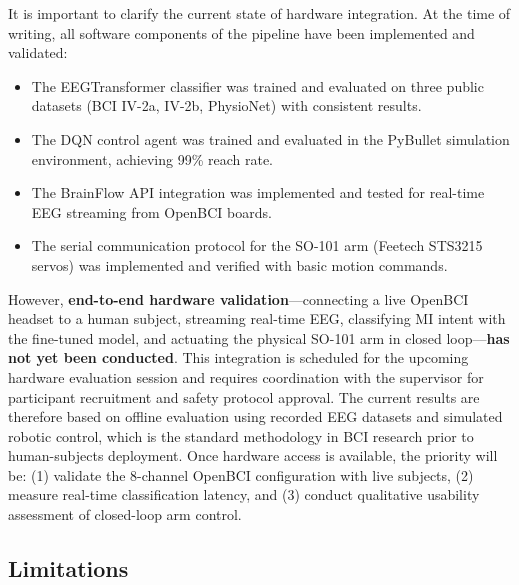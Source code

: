 \documentclass[12pt, a4paper]{article}
\begin{document}
It is important to clarify the current state of hardware integration. At the time of writing, all software components of the pipeline have been implemented and validated:
\begin{itemize}
    \item The EEGTransformer classifier was trained and evaluated on three public datasets (BCI IV-2a, IV-2b, PhysioNet) with consistent results.
    \item The DQN control agent was trained and evaluated in the PyBullet simulation environment, achieving 99\% reach rate.
    \item The BrainFlow API integration was implemented and tested for real-time EEG streaming from OpenBCI boards.
    \item The serial communication protocol for the SO-101 arm (Feetech STS3215 servos) was implemented and verified with basic motion commands.
\end{itemize}

However, \textbf{end-to-end hardware validation}---connecting a live OpenBCI headset to a human subject, streaming real-time EEG, classifying MI intent with the fine-tuned model, and actuating the physical SO-101 arm in closed loop---\textbf{has not yet been conducted}. This integration is scheduled for the upcoming hardware evaluation session and requires coordination with the supervisor for participant recruitment and safety protocol approval. The current results are therefore based on offline evaluation using recorded EEG datasets and simulated robotic control, which is the standard methodology in BCI research prior to human-subjects deployment. Once hardware access is available, the priority will be: (1) validate the 8-channel OpenBCI configuration with live subjects, (2) measure real-time classification latency, and (3) conduct qualitative usability assessment of closed-loop arm control.

\subsection{Limitations}
\end{document}

